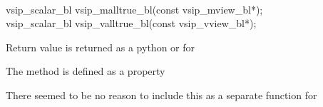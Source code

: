 \\\cvsiplh
\begin{cfuncs}
vsip\_scalar\_bl vsip\_malltrue\_bl(const vsip\_mview\_bl*);\Bs\\
vsip\_scalar\_bl vsip\_valltrue\_bl(const vsip\_vview\_bl*);\Bs\\
\end{cfuncs}
\pyjvsiph
{}
\begin{comments}
\item{Return value  is returned as a python  or  for \pyjv}
\item{The  method is defined as a property}
\item{There seemed to be no reason to include this as a separate function for \pyjv}
\end{comments}